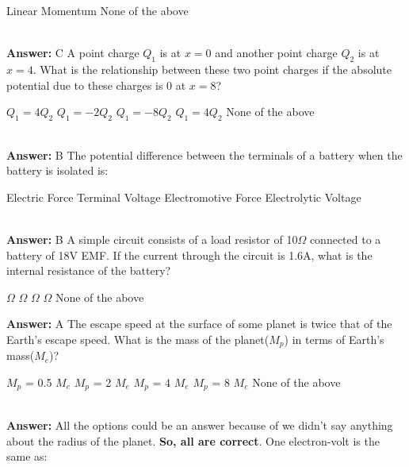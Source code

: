 \documentclass[11pt,addpoints]{exam}
\begin{document}
{{{\begin{questions}
\begin{oneparchoices}
						\choice Linear Momentum
						\choice None of the above
					\end{oneparchoices}
					\\ \textbf{Answer:} C
					\question A point charge $Q_1$ is at $x=0$ and another point charge $Q_2$ is at $x=4$. What is the relationship between these two point charges if the absolute potential due to these charges is 0 at $x=8$?\\
					\begin{oneparchoices}
						\choice $Q_1=4Q_2$
						\choice $Q_1=-2Q_2$
						\choice $Q_1=-8Q_2$
						\choice $Q_1=4Q_2$
						\choice None of the above
					\end{oneparchoices}
					\\ \textbf{Answer:} B
					\question The potential difference between the terminals of a battery when the battery is isolated is:\\
					\begin{oneparchoices}
						\choice Electric Force
						\choice Terminal Voltage
						\choice Electromotive Force
						\choice Electrolytic Voltage
					\end{oneparchoices}
					\\ \textbf{Answer:} B
					\question A simple circuit consists of a load resistor of 10$\Omega$ connected to a battery of 18V EMF. If the current through the circuit is 1.6A, what is the internal resistance of the battery?\\
					\begin{oneparchoices}
						\choice 1.25$\Omega$
						\choice 12.5$\Omega$
						\choice 10$\Omega$
						\choice 1.6$\Omega$
						\choice None of the above
					\end{oneparchoices}
					\textbf{Answer:} A
					\question The escape speed at the surface of some planet is twice that of the Earth's escape speed. What is the mass of the planet($M_p$) in terms of Earth's mass($M_e$)?\\
					\begin{oneparchoices}
						\choice $M_p$ = 0.5 $M_e$
						\choice $M_p$ = 2 $M_e$
						\choice $M_p$ = 4 $M_e$
						\choice $M_p$ = 8 $M_e$
						\choice None of the above
					\end{oneparchoices}
					\\ \textbf{Answer:} All the options could be an answer because of we didn't say anything about the radius of the planet. \textbf{So, all are correct}.
					\question One electron-volt is the same as:\\
					\begin{oneparchoices}

\end{oneparchoices}
\end{questions}}}}
\end{document}
